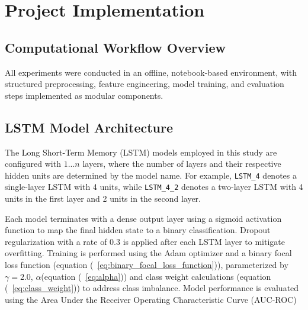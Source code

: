 
\section{Project Implementation}

\begin{comment}
\begin{itemize}
    \item System Architecture: For technical projects, outline the architecture or structure of your system.
    \item Development Process: Discuss the steps you took to build, test, and deploy your solution.
    \item Technologies Used: Mention programming languages, frameworks, or tools employed.
\end{itemize}
\end{comment}







\subsection{Computational Workflow Overview}

All experiments were conducted in an offline, notebook-based environment, with structured preprocessing, feature engineering, model training, and evaluation steps implemented as modular components. %

\subsection{LSTM Model Architecture}

The Long Short-Term Memory (LSTM) models employed in this study are configured with $1...n$ layers, where the number of layers and their respective hidden units are determined by the model name. For example, \texttt{LSTM\_4} denotes a single-layer LSTM with 4 units, while \texttt{LSTM\_4\_2} denotes a two-layer LSTM with 4 units in the first layer and 2 units in the second layer.

Each model terminates with a dense output layer using a sigmoid activation function to map the final hidden state to a binary classification. Dropout regularization with a rate of 0.3 is applied after each LSTM layer to mitigate overfitting. Training is performed using the Adam optimizer and a binary focal loss function (equation (~\ref{eq:binary_focal_loss_function})), parameterized by $\gamma = 2.0$,  $\alpha$(equation (~\ref{eq:alpha})) and class weight calculations (equation (~\ref{eq:class_weight}))  to address class imbalance. 
Model performance is evaluated using the Area Under the Receiver Operating Characteristic Curve (AUC-ROC)



